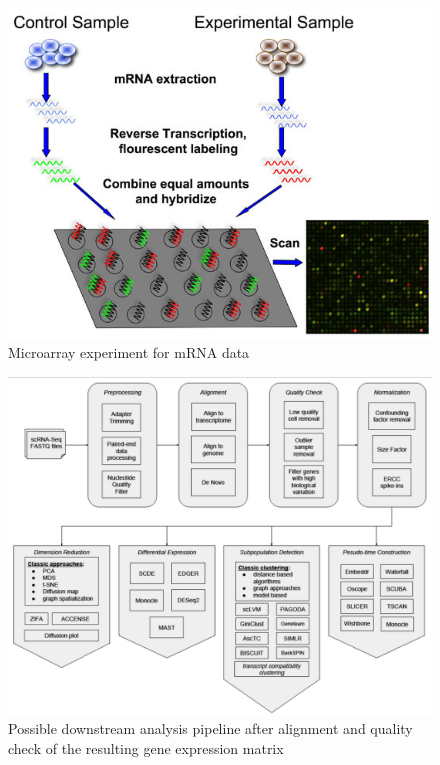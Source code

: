 \documentclass{report}
\begin{document}
\begin{figure}[H]
\centering
\includegraphics[scale=0.5]{illustrations/microarray.jpg}
\caption{Microarray experiment for mRNA data}
\label{microarray}
\end{figure}

\begin{figure}[H]
\centering
\includegraphics[scale=0.3]{illustrations/pipelinedownstream.png}
\caption{Possible downstream analysis pipeline after alignment and quality check of the resulting gene expression matrix\cite{poirion2016single}}
\label{pipeline}
\end{figure}
\end{document}
